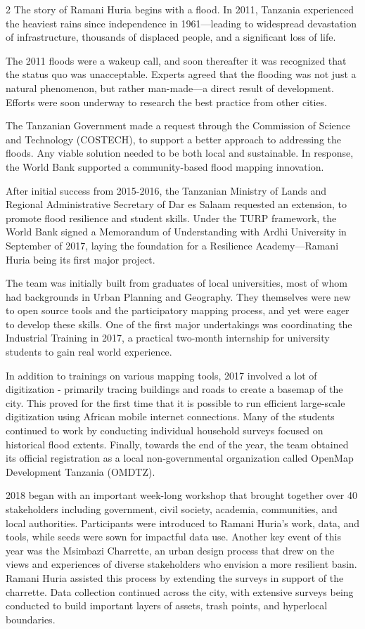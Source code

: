 \documentclass[a4paper,12pt,twoside]{article}
\begin{document}
\begin{multicols} {2}
The story of Ramani Huria begins with a flood. In 2011, Tanzania experienced the heaviest rains since independence in 1961---leading to widespread devastation of infrastructure, thousands of displaced people, and a significant loss of life. 

The 2011 floods were a wakeup call, and soon thereafter it was recognized that the status quo was unacceptable. Experts agreed that the flooding was not just a natural phenomenon, but rather man-made—a direct result of development. Efforts were soon underway to research the best practice from other cities. 

The Tanzanian Government made a request through the Commission of Science and Technology (COSTECH), to support a better approach to addressing the floods. Any viable solution needed to be both local and sustainable. In response, the World Bank supported a community-based flood mapping innovation.

After initial success from 2015-2016, the Tanzanian Ministry of Lands and Regional Administrative Secretary of Dar es Salaam requested an extension, to promote flood resilience and student skills. Under the TURP framework, the World Bank signed a Memorandum of Understanding with Ardhi University in September of 2017, laying the foundation for a Resilience Academy—Ramani Huria being its first major project.

The team was initially built from graduates of local universities, most of whom had backgrounds in Urban Planning and Geography. They themselves were new to open source tools and the participatory mapping process, and yet were eager to develop these skills. One of the first major undertakings was coordinating the Industrial Training in 2017, a practical two-month internship for university students to gain real world experience. 

In addition to trainings on various mapping tools, 2017  involved a lot of digitization - primarily tracing buildings and roads to create a basemap of the city. This proved for the first time  that it is possible to run efficient large-scale digitization using African mobile internet connections. Many of the students continued to work by conducting individual household surveys focused on historical flood extents. Finally, towards the end of the year, the team obtained its official registration as a local non-governmental organization called OpenMap Development Tanzania (OMDTZ). 

2018 began with an important week-long workshop that brought together over 40 stakeholders including government, civil society, academia, communities, and local authorities. Participants were introduced to Ramani Huria’s work, data, and tools, while seeds were sown for impactful data use. Another key event of this year was the Msimbazi Charrette, an urban design process that drew on the views and experiences of diverse stakeholders who envision a more resilient basin. Ramani Huria assisted this process by extending the surveys in support of the charrette. Data collection continued across the city, with extensive surveys being conducted to build important layers of assets, trash points, and hyperlocal boundaries. 


\end{multicols}
\end{document}
